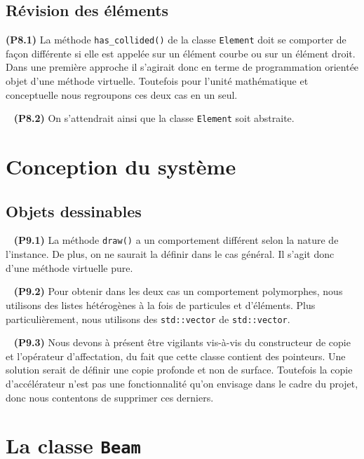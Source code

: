 \documentclass[12pt, letterpaper, twoside]{article}
\newcommand{\T}[1]{\texttt{#1}}
\begin{document}
\subsection{Révision des éléments}

\noindent \textbf{(P8.1)} La méthode \T{has\_collided()} de la classe \T{Element} doit se comporter de façon différente si elle est appelée sur un élément courbe ou sur un élément droit. Dans une première approche il s'agirait donc en terme de programmation orientée objet d'une méthode virtuelle. Toutefois pour l'unité mathématique et conceptuelle nous regroupons ces deux cas en un seul.

\ \linebreak
\noindent \textbf{(P8.2)} On s'attendrait ainsi que la classe \T{Element} soit abstraite.

\section{Conception du système}

\subsection{Objets dessinables}

\ \linebreak
\noindent \textbf{(P9.1)} La méthode \T{draw()} a un comportement différent selon la nature de l'instance. De plus, on ne saurait la définir dans le cas général. Il s'agit donc d'une méthode virtuelle pure.

\ \linebreak
\noindent \textbf{(P9.2)} Pour obtenir dans les deux cas un comportement polymorphes, nous utilisons des listes hétérogènes à la fois de particules et d'éléments. Plus particulièrement, nous utilisons des \T{std::vector} de \T{std::vector}.

\ \linebreak
\noindent \textbf{(P9.3)} Nous devons à présent être vigilants vis-à-vis du constructeur de copie et l'opérateur d'affectation, du fait que cette classe contient des pointeurs. Une solution serait de définir une copie profonde et non de surface. Toutefois la copie d'accélérateur n'est pas une fonctionnalité qu'on envisage dans le cadre du projet, donc nous contentons de supprimer ces derniers.

\section{La classe \T{Beam}}
\end{document}

